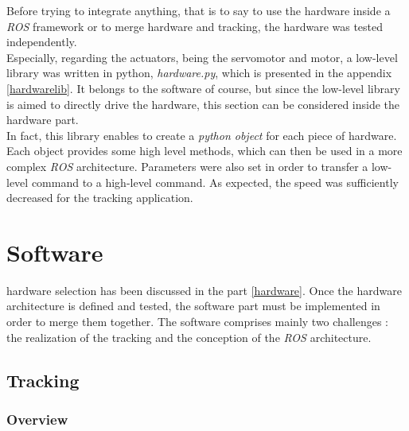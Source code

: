 		Before trying to integrate anything, that is to say 
		to use the hardware inside a \textit{ROS} framework 
		or to merge hardware and tracking, the hardware was
		tested independently.
		\\\indent Especially, regarding the actuators, 
		being the servomotor and motor, a low-level library 
		was written in python, \textit{hardware.py}, which is
		presented in the appendix \vref{hardwarelib}. 
		It belongs to the software of course, but since the low-level 
		library is aimed to directly drive the hardware, this 
		section can be considered inside the hardware part. 
		\\\indent In fact, this library enables to create
		a \textit{python object} for each piece
		of hardware. Each object provides
		some high level methods, which can 
		then be used in a more complex \textit{ROS}
		architecture. Parameters were also set 
		in order to transfer a low-level command
		to a high-level command. As expected, 
		the speed was sufficiently decreased for
		the tracking application.
		

\chapter{Software}\label{software}

	 hardware selection has been discussed in the part \vref{hardware}. 
	Once the hardware architecture is defined and tested, the software 
	part must be implemented in order to merge them together. The software
	comprises mainly two challenges : the realization of the tracking and the
	conception of the \textit{ROS} architecture.
	
	\section{Tracking}\label{tracking}
	
		
		\subsection{Overview}
		
